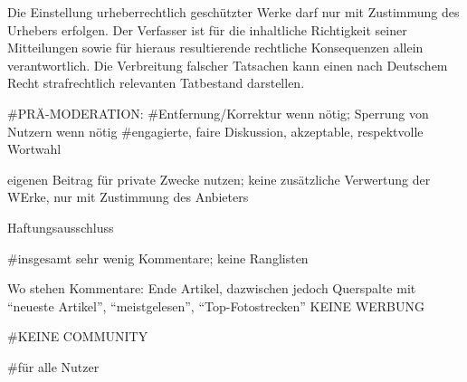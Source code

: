 Die Einstellung urheberrechtlich geschützter Werke darf nur mit Zustimmung des Urhebers erfolgen. Der Verfasser ist für die inhaltliche Richtigkeit seiner Mitteilungen sowie für hieraus resultierende rechtliche Konsequenzen allein verantwortlich. Die Verbreitung falscher Tatsachen kann einen nach Deutschem Recht strafrechtlich relevanten Tatbestand darstellen.

#PRÄ-MODERATION:
#Entfernung/Korrektur wenn nötig; Sperrung von Nutzern wenn nötig
#engagierte, faire Diskussion, akzeptable, respektvolle Wortwahl


eigenen Beitrag für private Zwecke nutzen; keine zusätzliche Verwertung der WErke, nur mit Zustimmung des Anbieters

Haftungsausschluss

#insgesamt sehr wenig Kommentare; keine Ranglisten

Wo stehen Kommentare: Ende Artikel, dazwischen jedoch Querspalte mit ``neueste Artikel'', ``meistgelesen'', ``Top-Fotostrecken'' KEINE WERBUNG

#KEINE COMMUNITY

#für alle Nutzer
